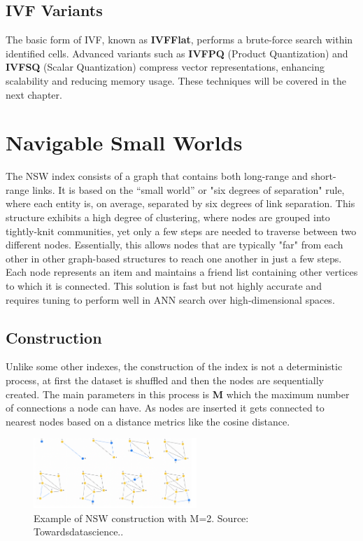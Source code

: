 \subsection{IVF Variants}
The basic form of IVF, known as \textbf{IVFFlat}, performs a brute-force search within identified cells. Advanced variants such as \textbf{IVFPQ} (Product Quantization) and \textbf{IVFSQ} (Scalar Quantization) compress vector representations, enhancing scalability and reducing memory usage. These techniques will be covered in the next chapter.


\section{Navigable Small Worlds}
The NSW index consists of a graph that contains both long-range and short-range links. It is based on the “small world” or "six degrees of separation" rule, where each entity is, on average, separated by six degrees of link separation. This structure exhibits a high degree of clustering, where nodes are grouped into tightly-knit communities, yet only a few steps are needed to traverse between two different nodes. Essentially, this allows nodes that are typically "far" from each other in other graph-based structures to reach one another in just a few steps. Each node represents an item and maintains a friend list containing other vertices to which it is connected. This solution is fast but not highly accurate and requires tuning to perform well in ANN search over high-dimensional spaces.

\subsection{Construction}
Unlike some other indexes, the construction of the index is not a deterministic process, at first the dataset is shuffled and then the nodes are sequentially created. The main parameters in this process is  \textbf{M} which the maximum number of connections a node can have. As nodes are inserted it gets connected to nearest nodes based on a distance metrics like the cosine distance.

\begin{figure}[h]
    \centering
\includegraphics[width=0.55\textwidth]{IMAGES/immagine_2025-02-27_132644429.png}
    \caption{Example of NSW construction with M=2. Source: Towardsdatascience.\footnotemark.}
    \label{fig:NSW}
\end{figure}


